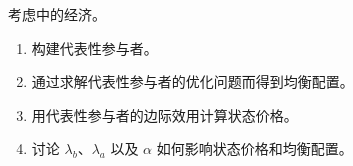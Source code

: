 \par\noindent\begin{minipage}{\linewidth}
\begin{problem}
 考虑中的经济。
\begin{enumerate}[label=(\alph*)]
    \item 构建代表性参与者。
    \item 通过求解代表性参与者的优化问题而得到均衡配置。
    \item 用代表性参与者的边际效用计算状态价格。
    \item 讨论 $\lambda_{b}$、$\lambda_{a}$ 以及 $\alpha$ 如何影响状态价格和均衡配置。
\end{enumerate}
\end{problem}
\end{minipage}\par
{}
